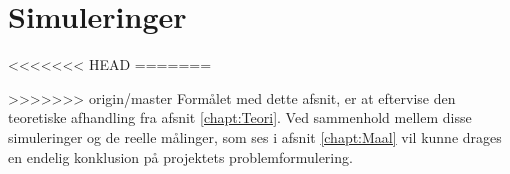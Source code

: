 \chapter{Simuleringer}
<<<<<<< HEAD
\label{chapt:Sim}
=======

\label{chap:sim}

>>>>>>> origin/master
Formålet med dette afsnit, er at eftervise den teoretiske afhandling fra afsnit \ref{chapt:Teori}. Ved sammenhold mellem disse simuleringer og de reelle målinger, som ses i afsnit \ref{chapt:Maal} vil kunne drages en endelig konklusion på projektets problemformulering. 



%
